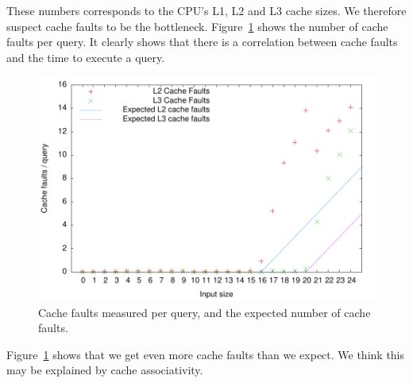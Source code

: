 These numbers corresponds to the CPU's L1, L2 and L3 cache sizes. We
therefore suspect cache faults to be the
bottleneck. Figure~\ref{fig:bs_cachefaults} shows the number of cache
faults per query. It clearly shows that there is a correlation between cache faults and the time to execute a query.

\begin{figure}[h!]
  \label{fig:bs_cachefaults}
  \centering
  \includegraphics{../week1/plots/outputs/bs_cachefaults}
  \caption{Cache faults measured per query, and the expected number of cache faults.}
\end{figure}

Figure~\ref{fig:bs_cachefaults} shows that we get even more cache
faults than we expect. We think this may be explained by cache
associativity.

